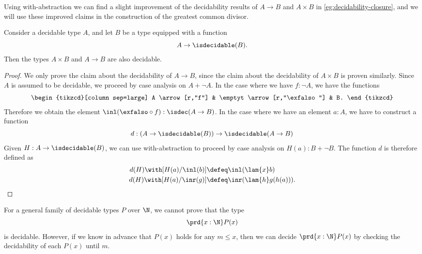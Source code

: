   Using with-abstraction we can find a slight improvement of the decidability results of $A\to B$ and $A\times B$ in \cref{eg:decidability-closure}, and we will use these improved claims in the construction of the greatest common divisor.

\begin{prp}\label{prp:is-decidable-function-type}
  Consider a decidable type $A$, and let $B$ be a type equipped with a function
  \begin{equation*}
    A\to\isdecidable(B).
  \end{equation*}
  Then the types $A\times B$ and $A\to B$ are also decidable.
\end{prp}

\begin{proof}
  We only prove the claim about the decidability of $A\to B$, since the claim about the decidability of $A\times B$ is proven similarly. Since $A$ is assumed to be decidable, we proceed by case analysis on $A+\neg A$. In the case where we have $f:\neg A$, we have the functions
  \begin{equation*}
    \begin{tikzcd}[column sep=large]
      A \arrow[r,"f"] & \emptyt \arrow[r,"\exfalso"] & B.
    \end{tikzcd}
  \end{equation*}
  Therefore we obtain the element $\inl(\exfalso\circ f):\isdec(A\to B)$. In the case where we have an element $a:A$, we have to construct a function
  \begin{equation*}
    d:(A\to\isdecidable(B))\to\isdecidable(A\to B)
  \end{equation*}
  Given $H:A\to\isdecidable(B)$, we can use with-abstraction to proceed by case analysis on $H(a):B+\neg B$. The function $d$ is therefore defined as
  \begin{align*}
    d(H)\with [H(a)/\inl(b)] & \defeq \inl(\lam{x}b) \\
    d(H)\with [H(a)/\inr(g)] & \defeq \inr(\lam{h}g(h(a))).\qedhere
  \end{align*}
\end{proof}

For a general family of decidable types $P$ over $\N$, we cannot prove that the type
\begin{equation*}
  \prd{x:\N}P(x)
\end{equation*}
is decidable. However, if we know in advance that $P(x)$ holds for any $m\leq x$, then we can decide $\prd{x:\N}P(x)$ by checking the decidability of each $P(x)$ until $m$. 

